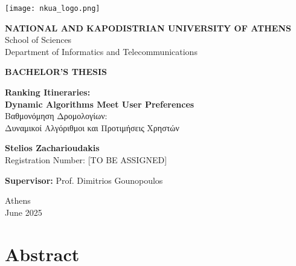 \documentclass[12pt,a4paper,twoside]{report}
\theoremstyle{definition}
\begin{document}
\begin{titlepage}
    \centering
    \texttt{[image: nkua\_logo.png]} %
    
    \vspace{1cm}
    
    {\Large \textbf{NATIONAL AND KAPODISTRIAN UNIVERSITY OF ATHENS}}\\
    \vspace{0.5cm}
    {\large School of Sciences\\
    Department of Informatics and Telecommunications}\\
    \vspace{2cm}
    
    {\Large \textbf{BACHELOR'S THESIS}}\\
    \vspace{2cm}
    
    {\huge \textbf{Ranking Itineraries:\\Dynamic Algorithms Meet User Preferences}}\\
    \vspace{1cm}
    {\Large \textgreek{Βαθμονόμηση Δρομολογίων:\\Δυναμικοί Αλγόριθμοι και Προτιμήσεις Χρηστών}}\\
    
    \vspace{2cm}
    
    {\Large \textbf{Stelios Zacharioudakis}}\\
    \vspace{0.5cm}
    {\large Registration Number: [TO BE ASSIGNED]}\\
    
    \vspace{3cm}
    
    {\large \textbf{Supervisor:} Prof. Dimitrios Gounopoulos}\\
    
    \vspace{2cm}
    
    {\large Athens\\
    June 2025}
\end{titlepage}

\newpage
\thispagestyle{empty}
\section*{Abstract}
\end{document}
